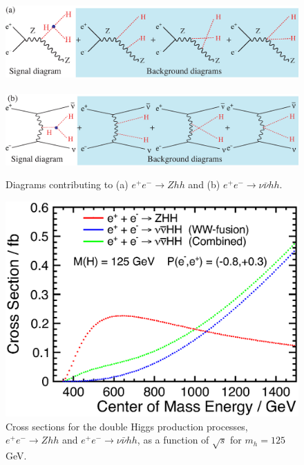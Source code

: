 
\begin{figure}[htb]
\centering
\includegraphics[width=130mm]{chapters/figures/zhhdiagrams.eps}
\\~\\
\includegraphics[width=130mm]{chapters/figures/vvhhdiagrams.eps}
\caption{Diagrams contributing to (a) $e^+e^- \to Zhh$ and (b) $e^+e^- \to \nu\bar{\nu}hh$.} 
\label{fig:hhdiagrams}
\end{figure}
\begin{figure}[htb]
\centering
\includegraphics[width=0.85\hsize]{chapters/figures/HHXSec_l.eps}
\caption{Cross sections for the double Higgs production processes, $e^+e^- \to Zhh$ and $e^+e^- \to \nu\bar{\nu}hh$, as a function of $\sqrt{s}$ for $m_h=125\,$GeV.} 
\label{fig:sigzhh_vvhh}
\end{figure}

